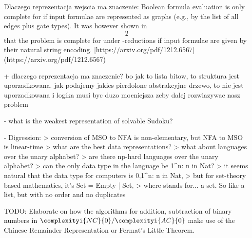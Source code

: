 

Dlaczego reprezentacja wejscia ma znaczenie:  
Boolean formula evaluation is only complete for  if input formulae are represented as graphs  
(e.g., by the list of all edges plus gate types). It was however shown in \[2\] that the problem is complete for  
 under -reductions if input formulae are given by their natural string encoding.  
[https://arxiv.org/pdf/1212.6567](https://arxiv.org/pdf/1212.6567)

+ dlaczego reprezentacja ma znaczenie? bo jak to lista bitow, to struktura jest uporzadkowana. jak podajemy jakies pierdolone abstrakcyjne drzewo, to nie jest uporzadkowana i logika musi byc duzo mocniejsza zeby dalej rozwiazywac nasz problem\!


- what is the weakest representation of solvable Sudoku?

- Digression:
> conversion of MSO to NFA is non-elementary, but NFA to MSO is linear-time  
> what are the best data representations?  
> what about languages over the unary alphabet?  
> are there np-hard languages over the unary alphabet?  
> can the only data type in the language be {1^n: n in Nat}?  
> it seems natural that the data type for computers is { {0,1}^n: n in Nat},  
> but for set-theory based mathematics, it's Set = Empty | {Set},  
> where {} stands for... a set. So like a list, but with no order and no duplicates


\item TODO: Elaborate on how the algorithms for addition, subtraction of binary numbers in $\complexityi{NC}{0}/\complexityi{AC}{0}$ make use of the Chinese Remainder Representation or Fermat's Little Theorem.
